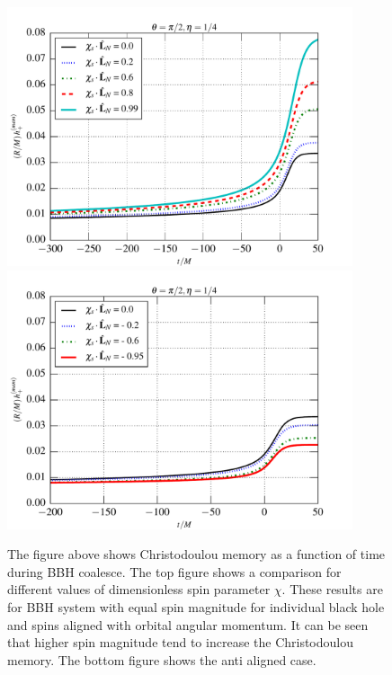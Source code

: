 \documentclass[prd,preprintnumbers,twocolumn,eqsecnum,floatfix,letter]{revtex4}
\begin{document}
\begin{figure}
	\includegraphics[width=4.0in]{../plots/MemoryPlot_AlignedSpinSXSdata/0p99.pdf}
	\includegraphics[width=4.0in]{../plots/MemoryPlot_AntialignedSpinSXSdata/m0p94.pdf}
	\caption{The figure above shows Christodoulou memory as a function of time during BBH coalesce. The top figure shows a comparison for different values of dimensionless spin parameter $\chi$. These results are for BBH system with equal spin magnitude for individual black hole and spins aligned with orbital angular momentum. It can be seen that higher spin magnitude tend to increase the Christodoulou memory. The bottom figure shows the anti aligned case.  }
	\label{fig:differntchivalues}
\end{figure}
\end{document}
